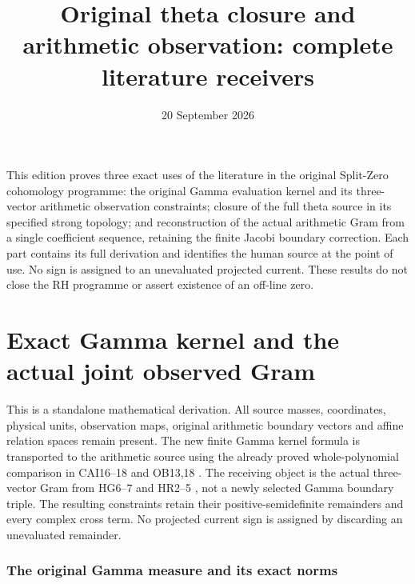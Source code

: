 \documentclass[11pt]{article}
\title{Original theta closure and arithmetic observation: complete literature receivers}
\author{}
\date{20 September 2026}
\begin{document}
\maketitle
This edition proves three exact uses of the literature in the original
Split-Zero cohomology programme: the original Gamma evaluation kernel and
its three-vector arithmetic observation constraints; closure of the full
theta source in its specified strong topology; and reconstruction of the
actual arithmetic Gram from a single coefficient sequence, retaining the
finite Jacobi boundary correction. Each part contains its full derivation
and identifies the human source at the point of use. No sign is assigned
to an unevaluated projected current. These results do not close the RH
programme or assert existence of an off-line zero.


\clearpage\begingroup
\part*{Exact Gamma kernel and the actual joint observed Gram}
\newtheorem{lgammatheorem}{Theorem}
\newtheorem{lgammalemma}[lgammatheorem]{Lemma}
\newtheorem{lgammaproposition}[lgammatheorem]{Proposition}
\newcommand{\lgammaC}{\mathbb C}
\newcommand{\lgammaR}{\mathbb R}
\newcommand{\lgammanorm}[1]{\left\lVert#1\right\rVert}
\newcommand{\lgammaim}{\operatorname{im}}
\newcommand{\lgammaremm}{\operatorname{rem}}



This is a standalone mathematical derivation.  All source masses,
coordinates, physical units, observation maps, original arithmetic boundary
vectors and affine relation spaces remain present.  The new finite Gamma
kernel formula is transported to the arithmetic source using the already
proved whole-polynomial comparison in CAI16--18 and OB13,18
\cite{lgamma:CAI,lgamma:OB}.  The receiving object is the actual three-vector Gram from
HG6--7 and HR2--5 \cite{lgamma:HG,lgamma:HR}, not a newly selected Gamma boundary triple.
The resulting constraints retain their positive-semidefinite remainders
and every complex cross term.  No projected current sign is assigned by
discarding an unevaluated remainder.

\section{The original Gamma measure and its exact norms}
\end{document}
